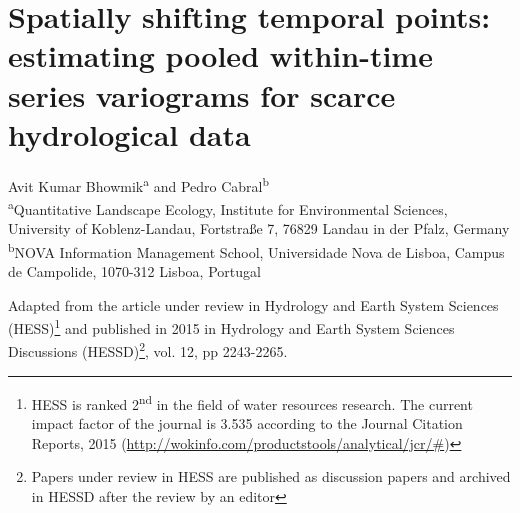 \chapter{Spatially shifting temporal points: estimating pooled within-time series variograms for scarce hydrological data}
\label{chapter3}

Avit Kumar Bhowmik\textsuperscript{a} and Pedro Cabral\textsuperscript{b}\\[.5cm]
\small
\textsuperscript{a}Quantitative Landscape Ecology, Institute for Environmental Sciences, University of Koblenz-Landau, Fortstraße 7, 76829 Landau in der Pfalz, Germany\\
\textsuperscript{b}NOVA Information Management School, Universidade Nova de Lisboa, Campus de Campolide, 1070-312 Lisboa, Portugal\\[1cm]

\normalsize

Adapted from the article under review in Hydrology and Earth System Sciences (HESS)\footnote{HESS is ranked 2\textsuperscript{nd} in the field of water resources research. The current impact factor of the journal is 3.535 according to the Journal Citation Reports, 2015 (\href{http://wokinfo.com/products_tools/analytical/jcr/#}{http://wokinfo.com/products\textunderscore tools/analytical/jcr/#})} and published in 2015 in Hydrology and Earth System Sciences Discussions (HESSD)\footnote{Papers under review in HESS are published as discussion papers and archived in HESSD after the review by an editor}, vol. 12, pp 2243-2265.\\[.5cm]

